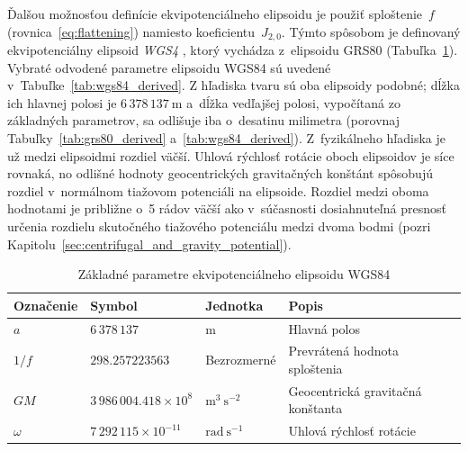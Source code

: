 \documentclass[a4paper,12pt]{book}
\begin{document}
Ďalšou možnosťou definície ekvipotenciálneho elipsoidu je použiť sploštenie~$f$ 
(rovnica~\ref{eq:flattening}) namiesto koeficientu~$J_{2,0}$.  Týmto spôsobom 
je definovaný ekvipotenciálny elipsoid \emph{WGS4} 
\parencite[angl. \textit{World Geodetic System~1984};][]{WGS84}, ktorý vychádza 
z~elipsoidu GRS80 (Tabuľka~\ref{tab:wgs84_fundamental}).  Vybraté odvodené 
parametre elipsoidu WGS84 sú uvedené v~Tabuľke~\ref{tab:wgs84_derived}.  
Z hľadiska tvaru sú oba elipsoidy podobné; dĺžka ich hlavnej polosi je $6\, 
378\, 137\ \mathrm{m}$ a~dĺžka vedľajšej polosi, vypočítaná zo základných 
parametrov, sa odlišuje iba o~desatinu milimetra (porovnaj 
Tabuľky~\ref{tab:grs80_derived} a~\ref{tab:wgs84_derived}).  Z~fyzikálneho 
hľadiska je už medzi elipsoidmi rozdiel väčší.  Uhlová rýchlosť rotácie oboch 
elipsoidov je síce rovnaká, no odlišné hodnoty geocentrických gravitačných 
konštánt spôsobujú rozdiel v~normálnom tiažovom potenciáli na elipsoide.  
Rozdiel medzi oboma hodnotami je približne o~5 rádov väčší ako v~súčasnosti 
dosiahnuteľná presnosť určenia rozdielu skutočného tiažového potenciálu medzi 
dvoma bodmi (pozri Kapitolu~\ref{sec:centrifugal_and_gravity_potential}).

\begin{table}
\begin{center}
\caption{Základné parametre ekvipotenciálneho elipsoidu WGS84}
\label{tab:wgs84_fundamental}
\small
\begin{tabular}{l l l l}
\hline
Označenie & Symbol & Jednotka & Popis\\
\hline
$a$       & $6\,378\,137$ & m & Hlavná polos\\
$1 \slash f$ & $298.257223563$ & Bezrozmerné & Prevrátená hodnota sploštenia\\
$GM$ & $3\,986\,004.418 \times 10^8$ & $\mathrm{m}^3 \ \mathrm{s}^{-2}$ 
& Geocentrická gravitačná konštanta\\
$\omega$ & $7\,292\,115 \times 10^{-11}$ & $\mathrm{rad} \ \mathrm{s}^{-1}$ 
& Uhlová rýchlosť rotácie\\
\hline
\end{tabular}
\end{center}
\end{table}
\end{document}
